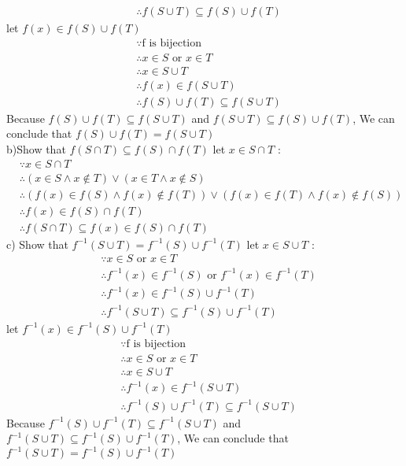 \documentclass{article}
\theoremstyle{definition}
\theoremstyle{plain}
\begin{document}
\begin {enumerate}[itemindent=30pt,label=\bf Exercise {\arabic*}:]
\begin{align*}
	&\therefore f(S \cup T) \subseteq f(S) \cup f(T)
\end{align*}
\subitem let $f(x) \in f(S) \cup f(T)$
\begin{align*}
	&\because \text{f is bijection} \\
	&\therefore x \in S \text{  or  } x \in T\\
	&\therefore x \in S \cup T \\
	&\therefore f(x) \in f(S \cup T)\\
	&\therefore f(S) \cup f(T) \subseteq f(S \cup T)
\end{align*}
\subitem Because $f(S) \cup f(T) \subseteq f(S \cup T)$ and $f(S \cup T) \subseteq f(S) \cup f(T)$, We can conclude that $f(S) \cup f(T) = f(S \cup T)$\\
\subitem b)Show that $f(S \cap T) \subseteq f(S) \cap f(T) $
\subitem let $x \in S \cap T$ :
\begin{align*}
	&\because x \in S \cap T \\
	&\therefore (x \in S \land x \not\in T) \lor (x \in T \land x \not\in S)\\
	&\therefore  (f(x) \in f(S) \land f(x) \not\in f(T)) \lor (f(x) \in f(T) \land f(x) \not\in f(S))\\
	&\therefore f(x) \in f(S) \cap f(T) \\
	&\therefore f(S \cap T) \subseteq f(x) \in f(S) \cap f(T)
\end{align*}
\subitem c) Show that $f^{-1}(S \cup T) = f^{-1}(S) \cup f^{-1}(T)$
\subitem let  $x \in S \cup T$ : 
\begin{align*}	
	&\because x \in S \text{  or  } x \in T\\
	&\therefore f^{-1}(x) \in f^{-1}(S) \text{  or  } f^{-1}(x) \in f^{-1}(T)\\
	&\therefore f^{-1}(x) \in f^{-1}(S) \cup f^{-1}(T)\\
	&\therefore f^{-1}(S \cup T) \subseteq f^{-1}(S) \cup f^{-1}(T)
\end{align*}
\subitem let $f^{-1}(x) \in f^{-1}(S) \cup f^{-1}(T)$
\begin{align*}
	&\because \text{f is bijection} \\
	&\therefore x \in S \text{  or  } x \in T\\
	&\therefore x \in S \cup T \\
	&\therefore f^{-1}(x) \in f^{-1}(S \cup T)\\
	&\therefore f^{-1}(S) \cup f^{-1}(T) \subseteq f^{-1}(S \cup T)
\end{align*}
\subitem Because $f^{-1}(S) \cup f^{-1}(T) \subseteq f^{-1}(S \cup T)$ and $f^{-1}(S \cup T) \subseteq f^{-1}(S) \cup f^{-1}(T)$, We can conclude that $f^{-1}(S \cup T) = f^{-1}(S) \cup f^{-1}(T)$\\

\end{enumerate}
\end{document}
